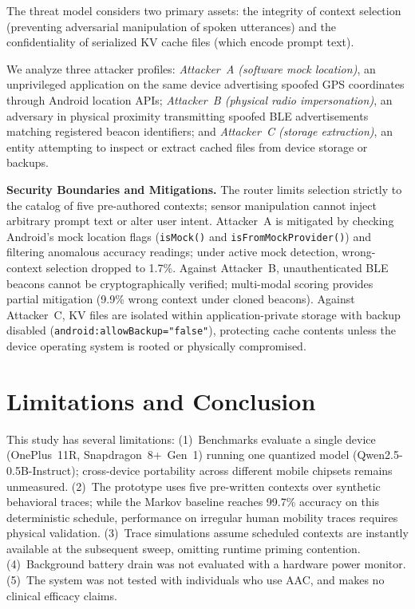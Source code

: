 \documentclass[conference]{IEEEtran}
\begin{document}
The threat model considers two primary assets: the integrity of context selection (preventing adversarial manipulation of spoken utterances) and the confidentiality of serialized KV cache files (which encode prompt text).

We analyze three attacker profiles: \emph{Attacker~A (software mock location)}, an unprivileged application on the same device advertising spoofed GPS coordinates through Android location APIs; \emph{Attacker~B (physical radio impersonation)}, an adversary in physical proximity transmitting spoofed BLE advertisements matching registered beacon identifiers; and \emph{Attacker~C (storage extraction)}, an entity attempting to inspect or extract cached files from device storage or backups.

\textbf{Security Boundaries and Mitigations.}
The router limits selection strictly to the catalog of five pre-authored contexts; sensor manipulation cannot inject arbitrary prompt text or alter user intent. Attacker~A is mitigated by checking Android's mock location flags (\texttt{isMock()} and \texttt{isFromMockProvider()}) and filtering anomalous accuracy readings; under active mock detection, wrong-context selection dropped to 1.7\%. Against Attacker~B, unauthenticated BLE beacons cannot be cryptographically verified; multi-modal scoring provides partial mitigation (9.9\% wrong context under cloned beacons). Against Attacker~C, KV files are isolated within application-private storage with backup disabled (\texttt{android:allowBackup="false"}), protecting cache contents unless the device operating system is rooted or physically compromised.

\section{Limitations and Conclusion}
\label{sec:conclusion}

This study has several limitations: (1)~Benchmarks evaluate a single device (OnePlus~11R, Snapdragon~8+~Gen~1) running one quantized model (Qwen2.5-0.5B-Instruct); cross-device portability across different mobile chipsets remains unmeasured. (2)~The prototype uses five pre-written contexts over synthetic behavioral traces; while the Markov baseline reaches 99.7\% accuracy on this deterministic schedule, performance on irregular human mobility traces requires physical validation. (3)~Trace simulations assume scheduled contexts are instantly available at the subsequent sweep, omitting runtime priming contention. (4)~Background battery drain was not evaluated with a hardware power monitor. (5)~The system was not tested with individuals who use AAC, and makes no clinical efficacy claims.
\end{document}
